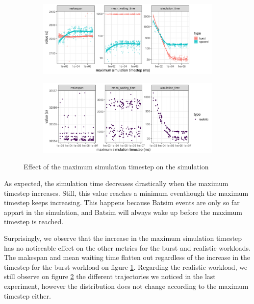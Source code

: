 \begin{figure}
	\begin{subfigure}{\textwidth}
		\centering
		\includegraphics[width=\textwidth]{../imgs/max-timestep_burst_sp.png}
		\caption{}
		\label{fig:timestep_burst_sp}
	\end{subfigure}

	\begin{subfigure}{\textwidth}
		\centering
		\includegraphics[width=\textwidth]{../imgs/max-timestep_realistic.png}
		\caption{}
		\label{fig:timestep_real}
	\end{subfigure}

	\caption{Effect of the maximum simulation timestep on the simulation}
	\label{fig:timestep}
\end{figure}

As expected, the simulation time decreases drastically when the maximum
timestep increases. Still, this value reaches a minimum eventhough the maximum
timestep keeps increasing. This happens because Batsim events are only so far
appart in the simulation, and Batsim will always wake up before the maximum
timestep is reached.

Surprisingly, we observe that the increase in the maximum simulation timestep
has no noticeable effect on the other metrics for the burst and realistic
workloads. The makespan and mean waiting time flatten out regardless of the
increase in the timestep for the burst workload on figure
\ref{fig:timestep_burst_sp}. Regarding the realistic workload, we still observe
on figure \ref{fig:timestep_real} the different trajectories we noticed in the
last experiment, however the distribution does not change according to the
maximum timestep either.

